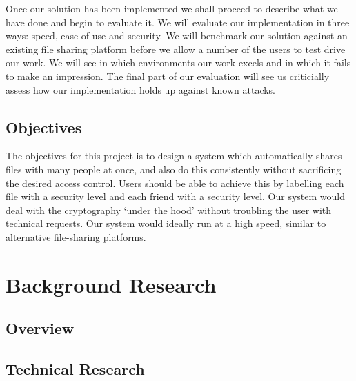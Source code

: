 \documentclass[12pt, titlepage]{article}
\begin{document}
\newline \indent Once our solution has been implemented we shall proceed to describe what we have done and begin to evaluate it. We will evaluate our implementation in three ways: speed, ease of use and security. We will benchmark our solution against an existing file sharing platform before we allow a number of the users to test drive our work. We will see in which environments our work excels and in which it fails to make an impression. The final part of our evaluation will see us criticially assess how our implementation holds up against known attacks.

\subsection{Objectives}
The objectives for this project is to design a system which automatically shares files with many people at once, and also do this consistently without sacrificing the desired access control. Users should be able to achieve this by labelling each file with a security level and each friend with a security level. Our system would deal with the cryptography `under the hood' without troubling the user with technical requests. Our system would ideally run at a high speed, similar to alternative file-sharing platforms.

\section{Background Research}
\subsection{Overview}

\subsection{Technical Research}
\end{document}
